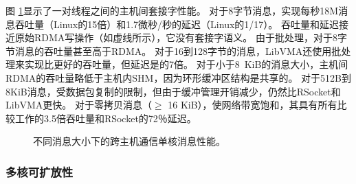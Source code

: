 图 \ref {socksdirect:fig:eval-msgsize-inter}显示了一对线程之间的主机间套接字性能。
对于8字节消息，\sys 实现每秒18M消息吞吐量（Linux的15倍）和1.7微秒/秒的延迟（Linux的1/17）。
吞吐量和延迟接近原始RDMA写操作（如虚线所示），它没有套接字语义。
由于批处理，\sys  {}对于8字节消息的吞吐量甚至高于RDMA。
对于16到128字节的消息，LibVMA还使用批处理来实现比\sys  {}更好的吞吐量，但延迟是\sys  {}的7倍。
对于小于8~KiB的消息大小，主机间RDMA的吞吐量略低于主机内SHM，因为环形缓冲区结构是共享的。
对于512B到8KiB消息，\sys  {}受数据包复制的限制，但由于缓冲管理开销减少，仍然比RSocket和LibVMA更快。
对于零拷贝消息（$\ge$ 16 KiB），\sys  {}使网络带宽饱和，其具有所有比较工作的3.5倍吞吐量和RSocket的72％延迟。


\begin{figure}[htbp]
	\centering
	
	\caption{不同消息大小下的跨主机通信单核消息性能。}
	\label{socksdirect:fig:eval-msgsize-inter}
\end{figure}




\subsubsection{多核可扩放性}

